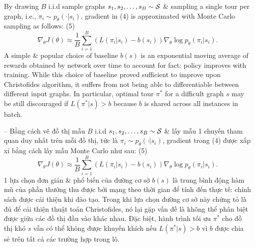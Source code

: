 \documentclass{article}
\begin{document}
\begin{itemize}
    By drawing $B$ i.i.d sample graphs $s_1,s_2,\ldots,s_B\sim{\cal S}$ \& sampling a single tour per graph, i.e., $\pi_i\sim p_\theta(\cdot|s_i)$, gradient in (4) is approximated with Monte Carlo sampling as follows: (5)
    \begin{equation*}
        \nabla_\theta J(\theta)\approx\frac{1}{B}\sum_{i=1}^B (L(\pi_i|s_i) - b(s_i))\nabla_\theta\log p_\theta(\pi_i|s_i).
    \end{equation*}
    A simple \& popular choice of baseline $b(s)$ is an exponential moving average of rewards obtained by network over time to account for fact: policy improves with training. While this choice of baseline proved sufficient to improve upon Christofides algorithm, it suffers from not being able to differentiable between different input graphs. In particular, optimal tour $\pi^*$ for a difficult graph $s$ may be still discouraged if $L(\pi^*|s) > b$ because $b$ is shared across all instances in batch.
    
    -- Bằng cách vẽ đồ thị mẫu $B$ i.i.d $s_1,s_2,\ldots,s_B\sim{\cal S}$ \& lấy mẫu 1 chuyến tham quan duy nhất trên mỗi đồ thị, tức là $\pi_i\sim p_\theta(\cdot|s_i)$, gradient trong (4) được xấp xỉ bằng cách lấy mẫu Monte Carlo như sau: (5)
    \begin{equation*}
        \nabla_\theta J(\theta)\approx\frac{1}{B}\sum_{i=1}^B (L(\pi_i|s_i) - b(s_i))\nabla_\theta\log p_\theta(\pi_i|s_i).
    \end{equation*}
    1 lựa chọn đơn giản \& phổ biến của đường cơ sở $b(s)$ là trung bình động hàm mũ của phần thưởng thu được bởi mạng theo thời gian để tính đến thực tế: chính sách được cải thiện khi đào tạo. Trong khi lựa chọn đường cơ sở này chứng tỏ là đủ để cải thiện thuật toán Christofides, nó lại gặp vấn đề là không thể phân biệt được giữa các đồ thị đầu vào khác nhau. Đặc biệt, hành trình tối ưu $\pi^*$ cho đồ thị khó $s$ vẫn có thể không được khuyến khích nếu $L(\pi^*|s) > b$ vì $b$ được chia sẻ trên tất cả các trường hợp trong lô.
    

\end{itemize}
\end{document}

